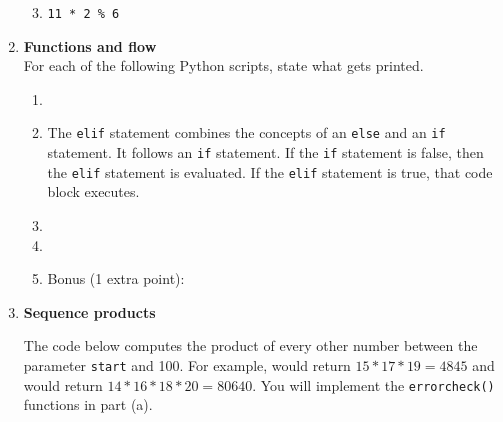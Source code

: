 \documentclass{article}
\begin{document}
\begin{enumerate}
\begin{enumerate}
\setcounter{enumii}{2}
\item \texttt{11 * 2 \% 6}
\end{enumerate}


\item \textbf{Functions and flow} \\
For each of the following Python scripts, state what gets printed.

\begin{enumerate}
\item 
\end{enumerate}

\begin{enumerate}
\setcounter{enumii}{1}
\item 
The \texttt{elif} statement combines the concepts of an \texttt{else} and an \texttt{if} statement.  It follows an \texttt{if} statement.  If the \texttt{if} statement is false, then the \texttt{elif} statement is evaluated.  If the \texttt{elif} statement is true, that code block executes.


\end{enumerate}

\begin{enumerate}
\setcounter{enumii}{2}
\item 
\end{enumerate}

\begin{enumerate}
\setcounter{enumii}{3}
\item 
\end{enumerate}

\begin{enumerate}
\setcounter{enumii}{4}
\item Bonus (1 extra point):


\end{enumerate}


\item \textbf{Sequence products}

The code below computes the product of every other number between the parameter \texttt{start} and 100.  For example,  would return $15 * 17 * 19 = 4845$ and  would return $14 * 16 * 18 * 20 = 80640$.  You will implement the \texttt{errorcheck()} functions in part (a). \\


\end{enumerate}
\end{document}
